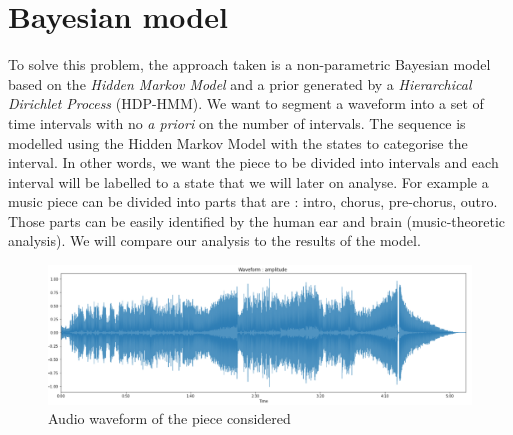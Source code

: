 
\section{Bayesian model}
\label{section:bayesmodel}
To solve this problem, the approach taken is a non-parametric Bayesian model based on the \textit{Hidden Markov Model} and a prior generated by a \textit{Hierarchical Dirichlet Process} (HDP-HMM). We want to segment a waveform into a set of time intervals with no \textit{a priori} on the number of intervals. The sequence is modelled using the Hidden Markov Model with the states to categorise the interval. In other words, we want the piece to be divided into intervals and each interval will be labelled to a state that we will later on analyse. For example a music piece can be divided into parts that are : intro, chorus, pre-chorus, outro. Those parts can be easily identified by the human ear and brain (music-theoretic analysis). We will compare our analysis to the results of the model. 

\begin{figure}[ht]
	\label{fig:waveform}
	\centering
  	\includegraphics[scale=0.25]{Graphics/Audio/waveform2} 
   	\caption{Audio waveform of the piece considered}
\end{figure}

